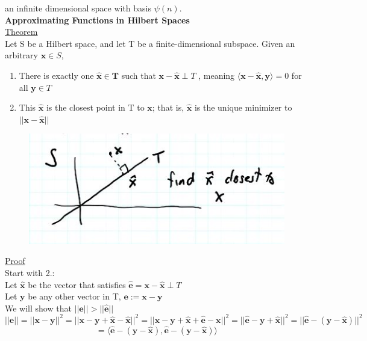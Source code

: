 \documentclass[12pt]{article}
\begin{document}
an infinite dimensional space with basis $\psi(n)$. \\
\color{ForestGreen}
\large{\textbf{Approximating Functions in Hilbert Spaces}}
\color{Black}\\
\underline{Theorem} \\
Let S be a Hilbert space, and let T be a finite-dimensional subspace. Given an arbitrary $\mathbf{x} \in S$, 
\begin{enumerate}
    \item There is exactly one $\hat{\mathbf{x}} \in \mathbf{T} $ such that $\mathbf{x} - \hat{\mathbf{x}} \perp T$ , meaning $ \langle \mathbf{x} - \hat{\mathbf{x}}, \mathbf{y} \rangle = 0 $ for all $\mathbf{y} \in T$
    \item This $\hat{\mathbf{x}}$ is the closest point in T to $\mathbf{x}$; that is, $\hat{\mathbf{x}}$ is the unique minimizer to $||\mathbf{x} - \hat{\mathbf{x}}||$ 
\end{enumerate}
 \begin{figure}[H]
     \centering
     \includegraphics[width=0.5\linewidth]{6250-L9-IMG1.JPG}
 \end{figure}
\underline{Proof} \\
Start with 2.: \\
Let $\hat{\mathbf{x}}$ be the vector that satisfies $\hat{\mathbf{e}} = \mathbf{x} - \hat{\mathbf{x}} \perp T$ \\
Let $\mathbf{y}$ be any other vector in T, $\mathbf{e} := \mathbf{x} - \mathbf{y}$ \\
We will show that $||\mathbf{e}|| > ||\hat{\mathbf{e}}||$ \\
\begin{equation*}
    ||\mathbf{e}||  = ||\mathbf{x} - \mathbf{y}||^2 = ||\mathbf{x} - \mathbf{y} + \hat{\mathbf{x}} - \hat{\mathbf{x}}||^2  = ||\mathbf{x} - \mathbf{y} + \hat{\mathbf{x}} + \hat{\mathbf{e}} - \mathbf{x}||^2 = ||\hat{\mathbf{e}} - \mathbf{y} + \hat{\mathbf{x}}||^2 = ||\hat{\mathbf{e}} - (\mathbf{y} - \hat{\mathbf{x}})||^2
\end{equation*}
\begin{equation*}
    = \langle \hat{\mathbf{e}} - (\mathbf{y} - \hat{\mathbf{x}}), \hat{\mathbf{e}} - (\mathbf{y} - \hat{\mathbf{x}}) \rangle
\end{equation*}
\end{document}
